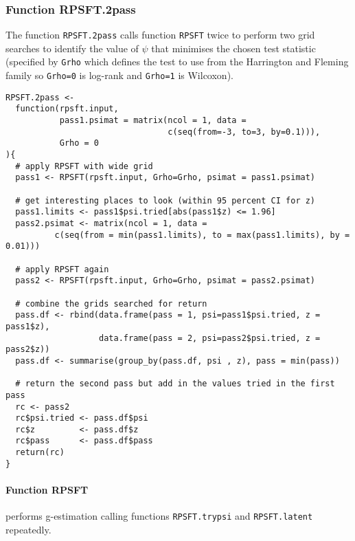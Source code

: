 \subsubsection{Function RPSFT.2pass}
The function \verb+RPSFT.2pass+ calls function \verb+RPSFT+ twice to perform two grid searches to identify the value of $\psi$ that minimises the chosen test statistic (specified by \verb+Grho+ which defines the test to use from the Harrington and Fleming family so \verb+Grho=0+ is log-rank and \verb+Grho=1+ is Wilcoxon).
\begin{Verbatim}[fontsize=\small, baselinestretch=0.75]
RPSFT.2pass <- 
  function(rpsft.input, 
           pass1.psimat = matrix(ncol = 1, data = 
                                 c(seq(from=-3, to=3, by=0.1))), 
           Grho = 0
){
  # apply RPSFT with wide grid
  pass1 <- RPSFT(rpsft.input, Grho=Grho, psimat = pass1.psimat)  
  
  # get interesting places to look (within 95 percent CI for z)
  pass1.limits <- pass1$psi.tried[abs(pass1$z) <= 1.96]
  pass2.psimat <- matrix(ncol = 1, data = 
          c(seq(from = min(pass1.limits), to = max(pass1.limits), by = 0.01)))  

  # apply RPSFT again
  pass2 <- RPSFT(rpsft.input, Grho=Grho, psimat = pass2.psimat)  

  # combine the grids searched for return
  pass.df <- rbind(data.frame(pass = 1, psi=pass1$psi.tried, z = pass1$z),
                   data.frame(pass = 2, psi=pass2$psi.tried, z = pass2$z))  
  pass.df <- summarise(group_by(pass.df, psi , z), pass = min(pass))  

  # return the second pass but add in the values tried in the first pass
  rc <- pass2
  rc$psi.tried <- pass.df$psi
  rc$z         <- pass.df$z
  rc$pass      <- pass.df$pass 
  return(rc)
}
\end{Verbatim}

\clearpage\newpage
\paragraph{Function RPSFT} performs g-estimation calling functions \verb+RPSFT.trypsi+ and \verb+RPSFT.latent+ repeatedly.

